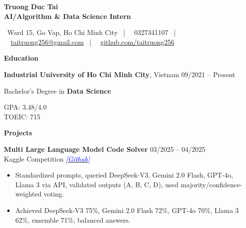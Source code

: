 \documentclass[10pt]{article}
\begin{document}
\begin{center}
    {\large \textbf{Truong Duc Tai}} \\
    \textbf{AI/Algorithm \& Data Science Intern}
\end{center}

\begin{center}
    \scriptsize
    \faMapMarker \ Ward 15, Go Vap, Ho Chi Minh City \ | \ 
    \faPhone \ 0327341107 \ | \ 
    \faEnvelope \ \href{mailto:taitruong256@gmail.com}{taitruong256@gmail.com} \ | \ 
    \faGithub \ \href{https://github.com/taitruong256}{github.com/taitruong256}
\end{center}

\begin{center}
    \vspace{0.05cm}
    \hrulefill
    \vspace{0.05cm}
\end{center}

\begin{center}
    \textbf{Education}
\end{center}

\textbf{Industrial University of Ho Chi Minh City}, Vietnam \hfill 09/2021 -- Present \\
\begin{minipage}[t]{0.65\textwidth}
    Bachelor’s Degree in \textbf{Data Science}
\end{minipage}%
\begin{minipage}[t]{0.35\textwidth}
    \raggedleft
    GPA: 3.48/4.0 \\
    TOEIC: 715
\end{minipage}

\begin{center}
    \vspace{0.05cm}
    \hrulefill
    \vspace{0.05cm}
\end{center}

\begin{center}
    \textbf{Projects}
\end{center}

\textbf{Multi Large Language Model Code Solver} \hfill 03/2025 -- 04/2025 \\
Kaggle Competition \hfill \href{https://github.com/taitruong256/CodeMMLU}{\textcolor{blue}{\textit{[Github]}}}

\begin{itemize}[noitemsep, topsep=0pt, partopsep=0pt, parsep=0pt]
    \item Standardized prompts, queried DeepSeek-V3, Gemini 2.0 Flash, GPT-4o, Llama 3 via API, validated outputs (A, B, C, D), used majority/confidence-weighted voting.
    \item Achieved DeepSeek-V3 75\%, Gemini 2.0 Flash 72\%, GPT-4o 70\%, Llama 3 62\%, ensemble 71\%; balanced answers.
\end{itemize}
\end{document}
